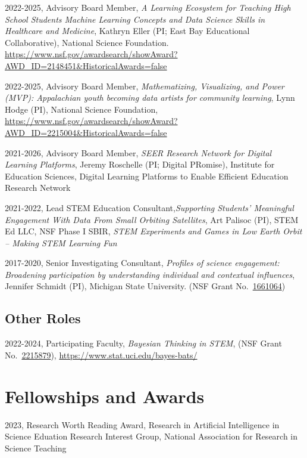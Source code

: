 \documentclass[
  14,
]{article}
\begin{document}
2022-2025, Advisory Board Member, \emph{A Learning Ecosystem for
Teaching High School Students Machine Learning Concepts and Data Science
Skills in Healthcare and Medicine}, Kathryn Eller (PI; East Bay
Educational Collaborative), National Science Foundation.
\url{https://www.nsf.gov/awardsearch/showAward?AWD_ID=2148451\&HistoricalAwards=false}

2022-2025, Advisory Board Member, \emph{Mathematizing, Visualizing, and
Power (MVP): Appalachian youth becoming data artists for community
learning}, Lynn Hodge (PI), National Science Foundation,
\url{https://www.nsf.gov/awardsearch/showAward?AWD_ID=2215004\&HistoricalAwards=false}

2021-2026, Advisory Board Member, \emph{SEER Research Network for
Digital Learning Platforms}, Jeremy Roschelle (PI; Digital PRomise),
Institute for Education Sciences, Digital Learning Platforms to Enable
Efficient Education Research Network

2021-2022, Lead STEM Education Consultant,\emph{Supporting Students'
Meaningful Engagement With Data From Small Orbiting Satellites}, Art
Palisoc (PI), STEM Ed LLC, NSF Phase I SBIR, \emph{STEM Experiments and
Games in Low Earth Orbit -- Making STEM Learning Fun}

2017-2020, Senior Investigating Consultant, \emph{Profiles of science
engagement: Broadening participation by understanding individual and
contextual influences}, Jennifer Schmidt (PI), Michigan State
University. (NSF Grant
No.~\href{https://nsf.gov/awardsearch/showAward?AWD_ID=1661064\&HistoricalAwards=false}{1661064})

\hypertarget{other-roles}{%
\subsection{Other Roles}\label{other-roles}}

2022-2024, Participating Faculty, \emph{Bayesian Thinking in STEM}, (NSF
Grant
No.~\href{https://www.nsf.gov/awardsearch/showAward?AWD_ID=2215879\&HistoricalAwards=false}{2215879}),
\url{https://www.stat.uci.edu/bayes-bats/}

\hypertarget{fellowships-and-awards}{%
\section{Fellowships and Awards}\label{fellowships-and-awards}}

2023, Research Worth Reading Award, Research in Artificial Intelligence
in Science Eduation Research Interest Group, National Association for
Research in Science Teaching
\end{document}
